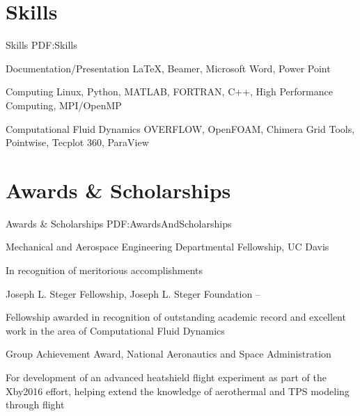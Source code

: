 \documentclass[letterpaper,MMMyyyy,nonstop]{simpleresumecv}
\begin{document}
\begin{body}

\section
{Skills}
{Skills}
{PDF:Skills}

Documentation/Presentation
\BulletItem
{\LaTeX},
Beamer,
Microsoft Word, Power Point

\GapNoBreak
Computing
\BulletItem
Linux,
Python,
MATLAB,
FORTRAN,
C++,
High Performance Computing,
MPI/OpenMP

\GapNoBreak
Computational Fluid Dynamics
\BulletItem
OVERFLOW,
OpenFOAM,
Chimera Grid Tools,
Pointwise,
Tecplot 360,
ParaView





\section
{Awards \&\newline
Scholarships}
{Awards \& Scholarships}
{PDF:AwardsAndScholarships}

\BulletItem
Mechanical and Aerospace Engineering Departmental Fellowship,
UC Davis
\hfill
\begin{detail}
\SubItem
In recognition of meritorious accomplishments
\end{detail}

\Gap
\BulletItem
Joseph L. Steger Fellowship,
Joseph L. Steger Foundation
\hfill
 --
\begin{detail}
\SubItem
Fellowship awarded in recognition of outstanding academic record and excellent work in the area of Computational Fluid Dynamics
\end{detail}

\BulletItem
Group Achievement Award,
National Aeronautics and Space Administration
\hfill
\begin{detail}
\SubItem
For development of an advanced heatshield flight experiment as part of the Xby2016 effort, helping extend the knowledge of aerothermal and TPS modeling through flight
\end{detail}


\end{body}
\end{document}
